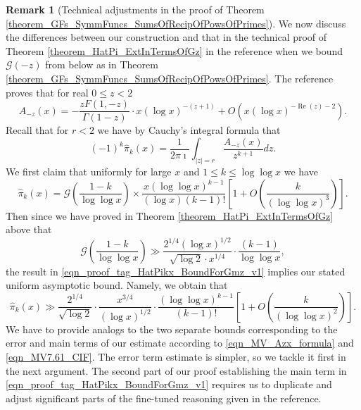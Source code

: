 \documentclass[11pt,reqno,a4letter]{article}
\numberwithin{figure}{section}
\numberwithin{table}{section}
\theoremstyle{plain}
\numberwithin{theorem}{section}
\theoremstyle{definition}
\newtheorem{remark}[theorem]{Remark}
\renewcommand{\Re}{\operatorname{Re}}
\begin{document}
\begin{remark}[Technical adjustments in the proof of Theorem \ref{theorem_GFs_SymmFuncs_SumsOfRecipOfPowsOfPrimes}] 
\label{remark_TechAdjustments_theorem_HatPi_ExtInTermsOfGz_TO_GFs_SymmFuncs_SumsOfRecipOfPowsOfPrimes} 
We now discuss the differences between our construction and that in 
the technical proof of Theorem \ref{theorem_HatPi_ExtInTermsOfGz} 
in the reference when we bound $\mathcal{G}(-z)$ from below as in 
Theorem \ref{theorem_GFs_SymmFuncs_SumsOfRecipOfPowsOfPrimes}. 
The reference proves that for real $0 \leq z < 2$ 
\begin{equation} 
\label{eqn_MV_Azx_formula} 
A_{-z}(x) = -\frac{z F(1, -z)}{\Gamma(1-z)} \cdot x (\log x)^{-(z+1)} + 
     O\left(x (\log x)^{-\Re(z) - 2}\right). 
\end{equation}
Recall that for $r < 2$ we have by Cauchy's integral formula that 
\begin{equation} 
\label{eqn_MV7.61_CIF} 
(-1)^{k} \widehat{\pi}_k(x) = \frac{1}{2\pi\imath} \int_{|z|=r} 
     \frac{A_{-z}(x)}{z^{k+1}} dz. 
\end{equation} 
We first claim that uniformly for large $x$ and $1 \leq k \leq \log\log x$ we have 
\begin{equation} 
\label{eqn_proof_tag_HatPikx_BoundForGmz_v1} 
\widehat{\pi}_k(x) = \mathcal{G}\left(\frac{1-k}{\log\log x}\right) \times 
     \frac{x (\log\log x)^{k-1}}{(\log x) (k-1)!} 
     \left[1 + O\left(\frac{k}{(\log\log x)^3}\right)\right]. 
\end{equation} 
Then since we have proved in Theorem \ref{theorem_HatPi_ExtInTermsOfGz} 
above that 
\[
\mathcal{G}\left(\frac{1-k}{\log\log x}\right) \gg 
     \frac{2^{1/4} (\log x)^{1/2}}{\sqrt{\log 2} \cdot x^{1/4}} \cdot 
     \frac{(k-1)}{\log\log x}, 
\]
the result in \eqref{eqn_proof_tag_HatPikx_BoundForGmz_v1} implies our 
stated uniform asymptotic bound. Namely, we obtain that 
\[
\widehat{\pi}_k(x) \gg \frac{2^{1/4}}{\sqrt{\log 2}} \cdot 
     \frac{x^{3/4}}{(\log x)^{1/2}} \cdot 
     \frac{(\log\log x)^{k-1}}{(k-1)!} \left[1 + 
     O\left(\frac{k}{(\log\log x)^2}\right)\right]. 
\]
We have to provide analogs to the two separate bounds corresponding to the error and 
main terms of our estimate according to 
\eqref{eqn_MV_Azx_formula} and \eqref{eqn_MV7.61_CIF}. 
The error term estimate is simpler, so we tackle it first in the next argument. 
The second part of our proof establishing the main term in 
\eqref{eqn_proof_tag_HatPikx_BoundForGmz_v1} 
requires us to duplicate and adjust significant parts of the 
fine-tuned reasoning given in the reference. \\ 

\end{remark}
\end{document}
